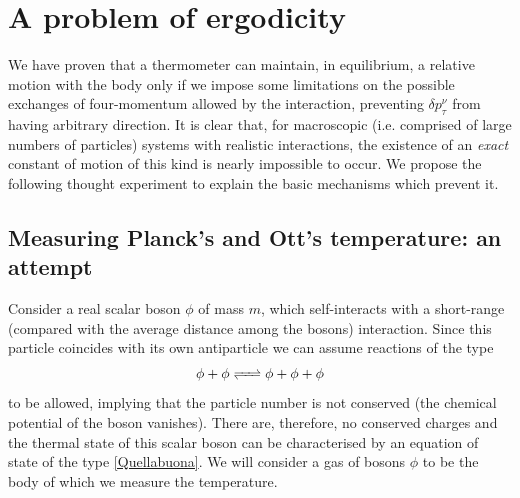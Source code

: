\documentclass[twocolumn,usenatbib]{mnras2}
\begin{document}
\section{A problem of ergodicity}\label{Iosonoegodico}

We have proven that a thermometer can maintain, in equilibrium, a relative motion with the body only if we impose some limitations on the possible exchanges of four-momentum allowed by the interaction, preventing $\delta p^\nu_\tau$ from having arbitrary direction. It is clear that, for macroscopic (i.e. comprised of large numbers of particles) systems with realistic interactions, the existence of an \textit{exact} constant of motion of this kind is nearly impossible to occur. We propose the following thought experiment to explain the basic mechanisms which prevent it.




\subsection{Measuring Planck's and Ott's temperature: an attempt}\label{MPOce}

Consider a real scalar boson $\phi$ of mass $m$, which self-interacts with a short-range (compared with the average distance among the bosons) interaction. Since this particle coincides with its own antiparticle we can assume reactions of the type
\begin{equation}
\phi + \phi \ce{ <=> } \phi + \phi + \phi
\end{equation}
to be allowed, implying that the particle number is not conserved (the chemical potential of the boson vanishes). There are, therefore, no conserved charges and the thermal state of this scalar boson can be characterised by an equation of state of the type \eqref{Quellabuona}. We will consider a gas of bosons $\phi$ to be the body of which we measure the temperature. 
\end{document}
